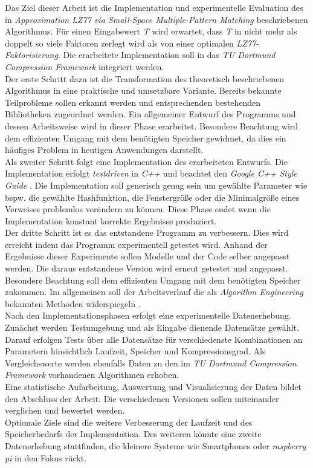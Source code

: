 	Das Ziel dieser Arbeit ist die Implementation und experimentelle Evaluation des in {\it Approximation LZ77 via Small-Space Multiple-Pattern Matching} beschriebenen Algorithmus. Für einen Eingabewert \textit{T} wird erwartet, dass \textit{T} in nicht mehr als doppelt so viele Faktoren zerlegt wird als von einer optimalen \textit{LZ77-Faktorisierung}. Die erarbeitete Implementation soll in das {\it TU Dortmund Compression Framework} integriert werden.\\
	Der erste Schritt dazu ist die Transformation des theoretisch beschriebenen Algorithmus in eine praktische und umsetzbare Variante. Bereits bekannte Teilprobleme sollen erkannt werden und entsprechenden bestehenden Bibliotheken zugeordnet werden.
	Ein allgemeiner Entwurf des Programms und dessen Arbeitsweise wird in dieser Phase erarbeitet.
	Besondere Beachtung wird dem effizienten Umgang mit dem benötigten Speicher gewidmet, da dies ein häufiges Problem in heutigen Anwendungen darstellt.\\
	Als zweiter Schritt folgt eine Implementation des erarbeiteten Entwurfs. Die Implementation erfolgt \textit{testdriven} in \textit{C++} und beachtet den \textit{Google C++ Style Guide} \cite{styleguide}. Die Implementation soll generisch genug sein um gewählte Parameter wie bspw. die gewählte Hashfunktion, die Fenstergröße oder die Minimalgröße eines Verweises problemlos verändern zu können.
	Diese Phase endet wenn die Implementation konstant korrekte Ergebnisse produziert.\\
	Der dritte Schritt ist es das entstandene Programm zu verbessern. Dies wird erreicht indem das Programm experimentell getestet wird. Anhand der Ergebnisse dieser Experimente sollen Modelle und der Code selber angepasst werden. Die daraus entstandene Version wird erneut getestet und angepasst. Besondere Beachtung soll dem effizienten Umgang mit dem benötigten Speicher zukommen. Im allgemeinen soll der Arbeitsverlauf die als \textit{Algorithm Engineering} bekannten Methoden widerspiegeln \cite{Algoengeieer}.\\
	Nach den Implementationsphasen erfolgt eine experimentelle Datenerhebung. Zunächst werden Testumgebung und als Eingabe dienende Datensätze gewählt. Darauf erfolgen Tests über alle Datensätze für verschiedenste Kombinationen an Parametern hinsichtlich Laufzeit, Speicher und Kompressionsgrad.
	Als Vergleichswerte werden ebenfalls Daten zu den im {\it TU Dortmund Compression Framework} vorhandenen Algorithmen erhoben.\\
	Eine statistische Aufarbeitung, Auswertung und Visualisierung der Daten bildet den Abschluss der Arbeit. Die verschiedenen Versionen sollen miteinander verglichen und bewertet werden.\\
	Optionale Ziele sind die weitere Verbesserung der Laufzeit und des Speicherbedarfs der Implementation.
	Des weiteren könnte eine zweite Datenerhebung stattfinden, die kleinere Systeme wie Smartphones oder \textit{raspberry pi} in den Fokus rückt. 

